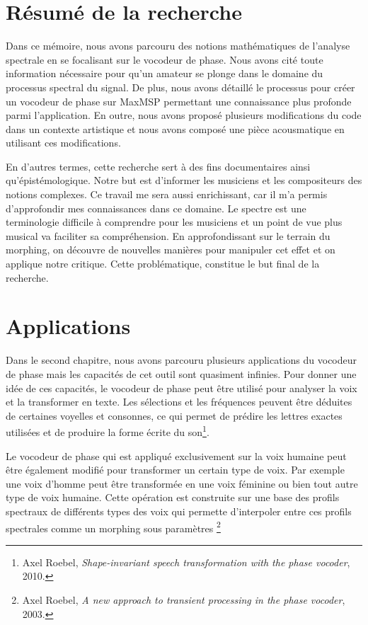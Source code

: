 \label{ch:conclusions}

\section{Résumé de la recherche}

Dans ce mémoire, nous avons parcouru des notions mathématiques de l'analyse spectrale en se focalisant sur le vocodeur de phase. Nous avons cité toute information nécessaire pour qu'un amateur se plonge dans le domaine du processus spectral du signal. De plus, nous avons détaillé le processus pour créer un vocodeur de phase sur MaxMSP permettant une connaissance plus profonde parmi l'application. En outre, nous avons proposé plusieurs modifications du code dans un contexte artistique et nous avons composé une pièce acousmatique en utilisant ces modifications.

En d'autres termes, cette recherche sert à des fins documentaires ainsi qu'épistémologique. Notre but est d'informer les musiciens et les compositeurs des notions complexes. Ce travail me sera aussi enrichissant, car il m'a permis d'approfondir mes connaissances dans ce domaine. Le spectre est une terminologie difficile à comprendre pour les musiciens et un point de vue plus musical va faciliter sa compréhension. En approfondissant sur le terrain du morphing, on découvre de nouvelles manières pour manipuler cet effet et on applique notre critique. Cette problématique, constitue le but final de la recherche.

\section{Applications}

Dans le second chapitre, nous avons parcouru plusieurs applications du vocodeur de phase mais les capacités de cet outil sont quasiment infinies. Pour donner une idée de ces capacités, le vocodeur de phase peut être utilisé pour analyser la voix et la transformer en texte. Les sélections et les fréquences peuvent être déduites de certaines voyelles et consonnes, ce qui permet de prédire les lettres exactes utilisées et de produire la forme écrite du son\footnote{Axel Roebel, \textit{Shape-invariant speech transformation with the phase vocoder}, 2010.\nocite{roebel2010shape}}.

Le vocodeur de phase qui est appliqué exclusivement sur la voix humaine peut être également modifié pour transformer un certain type de voix. Par exemple une voix d'homme peut être transformée en une voix féminine ou bien tout autre type de voix humaine. Cette opération est construite sur une base des profils spectraux de différents types des voix qui permette d'interpoler entre ces profils spectrales comme un morphing sous paramètres \footnote{Axel Roebel, \textit{A new approach to transient processing in the phase vocoder}, 2003. \nocite{roebel:hal-01161124}}

